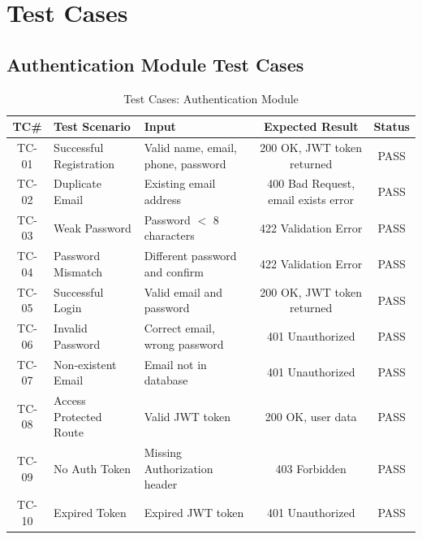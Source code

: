 \section{Test Cases}

\subsection{Authentication Module Test Cases}

\begin{table}[H]
  \centering
  \caption{Test Cases: Authentication Module}
  \label{tab:tc-auth}
  \begin{tabularx}{\textwidth}{@{}c l X c c@{}}
    \toprule
    \textbf{TC\#} & \textbf{Test Scenario} & \textbf{Input} & \textbf{Expected Result} & \textbf{Status} \\
    \midrule
    TC-01 & Successful Registration & Valid name, email, phone, password & 200 OK, JWT token returned & \textcolor{green!70!black}{PASS} \\
    TC-02 & Duplicate Email & Existing email address & 400 Bad Request, email exists error & \textcolor{green!70!black}{PASS} \\
    TC-03 & Weak Password & Password $<$ 8 characters & 422 Validation Error & \textcolor{green!70!black}{PASS} \\
    TC-04 & Password Mismatch & Different password and confirm & 422 Validation Error & \textcolor{green!70!black}{PASS} \\
    TC-05 & Successful Login & Valid email and password & 200 OK, JWT token returned & \textcolor{green!70!black}{PASS} \\
    TC-06 & Invalid Password & Correct email, wrong password & 401 Unauthorized & \textcolor{green!70!black}{PASS} \\
    TC-07 & Non-existent Email & Email not in database & 401 Unauthorized & \textcolor{green!70!black}{PASS} \\
    TC-08 & Access Protected Route & Valid JWT token & 200 OK, user data & \textcolor{green!70!black}{PASS} \\
    TC-09 & No Auth Token & Missing Authorization header & 403 Forbidden & \textcolor{green!70!black}{PASS} \\
    TC-10 & Expired Token & Expired JWT token & 401 Unauthorized & \textcolor{green!70!black}{PASS} \\
    \bottomrule
  \end{tabularx}
\end{table}


